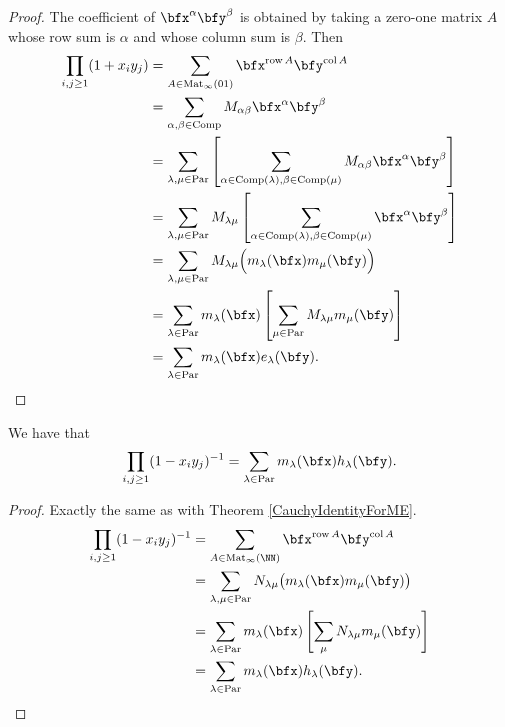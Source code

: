 \documentclass{article}
\DeclareMathOperator{\row}{row}
\DeclareMathOperator{\col}{col}
\DeclareMathOperator{\Par}{Par}
\DeclareMathOperator{\Com}{Comp}
\DeclareMathOperator{\Mat}{Mat}
\begin{document}
\begin{proof}
    The coefficient of $\bfx^\alpha \bfy^\beta$ is obtained by taking a zero-one matrix $A$ whose row sum is $\alpha$ and whose column sum is $\beta$. Then
    \begin{align*}
        \prod_{i,j\geq1}(1+x_iy_j)
        &=
        \sum_{A \in \Mat_\infty(01)}
        \bfx^{\row A}\bfy^{\col A} \\
        &=
        \sum_{\alpha,\beta \in \Com}
        M_{\alpha\beta}\bfx^\alpha \bfy^\beta \\
        &=
        \sum_{\lambda,\mu\in\Par}
        \left[
            \sum_{\alpha \in \Com(\lambda), \beta \in \Com(\mu)}
            M_{\alpha\beta} \bfx^\alpha \bfy^\beta
        \right] \\
        &=
        \sum_{\lambda,\mu\in\Par}
        M_{\lambda\mu}
        \left[
            \sum_{\alpha \in \Com(\lambda), \beta \in \Com(\mu)}
            \bfx^\alpha \bfy^\beta
        \right] \\
        &=
        \sum_{\lambda,\mu \in \Par}
        M_{\lambda\mu}
        \Big(
            m_\lambda(\bfx) m_\mu(\bfy)
        \Big) \\
        &=
        \sum_{\lambda \in \Par}
        m_\lambda(\bfx)
        \left[
            \sum_{\mu\in\Par}
            M_{\lambda\mu} m_\mu(\bfy)
        \right] \\
        &=
        \sum_{\lambda \in \Par}
        m_\lambda(\bfx) e_\lambda(\bfy).
    \end{align*}
\end{proof}

\begin{theorem}\label{CauchyIdentityForMH}
    We have that
    \[
        \prod_{i,j \geq 1} (1-x_iy_j)^{-1} = \sum_{\lambda\in\Par} m_\lambda(\bfx) h_\lambda(\bfy).
    \]
\end{theorem}

\begin{proof}
    Exactly the same as with Theorem \ref{CauchyIdentityForME}.
    \begin{align*}
        \prod_{i,j\geq1}(1-x_iy_j)^{-1} 
        &= 
        \sum_{A \in \Mat_\infty(\NN)}
        \bfx^{\row A}\bfy^{\col A} 
        \\
        &= 
        \sum_{\lambda,\mu\in\Par} N_{\lambda\mu} 
        \big(m_\lambda(\bfx) m_\mu(\bfy)\big) 
        \\
        &= 
        \sum_{\lambda\in\Par} 
        m_\lambda(\bfx) 
        \left[
            \sum_\mu N_{\lambda\mu} m_\mu(\bfy)
        \right]
        \\
        &= 
        \sum_{\lambda\in\Par} 
        m_\lambda(\bfx) h_\lambda(\bfy).
    \end{align*}
\end{proof}
\end{document}
